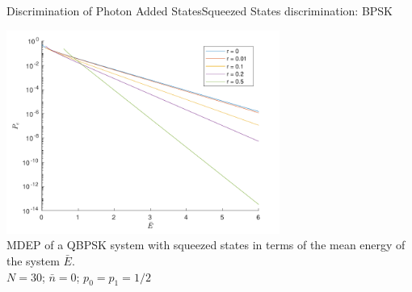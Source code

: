 \begin{frame}{Discrimination of Photon Added States}{Squeezed States discrimination: BPSK}
    \begin{center}
        \includegraphics[width=0.67\textwidth]{Pictures/fig3.5.pdf}\\
        \scriptsize{
        MDEP of a QBPSK system with squeezed states in terms of the mean energy of the system $\bar{E}$.\\
        $N=30$; $\bar{n}=0$; $p_0=p_1=1/2$
        }
    \end{center}

\end{frame}